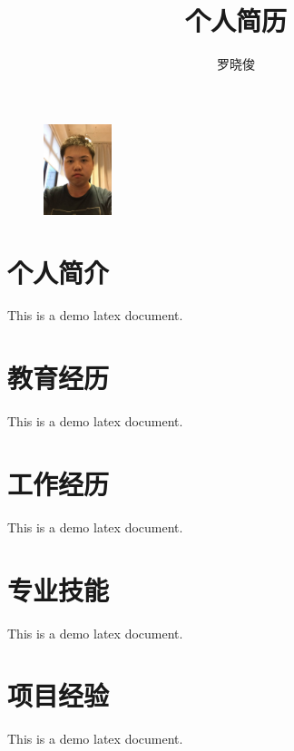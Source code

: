 \documentclass[a4paper,12pt]{article}
\title{个人简历}
\author{罗晓俊}
\begin{document}
	\begin{CJK}{UTF8}{gbsn}

		\maketitle{}

		\begin{figure}[h]
			\centering\includegraphics[height=100px]{webwxgetmsgimg.jpeg}
		\end{figure}

		\section{个人简介}
		This is a demo latex document.
		
		\section{教育经历}
		This is a demo latex document.
		
		\section{工作经历}
		This is a demo latex document.
		
		\section{专业技能}
		This is a demo latex document.
		
		\section{项目经验}
		This is a demo latex document.

	\end{CJK}
\end{document}
